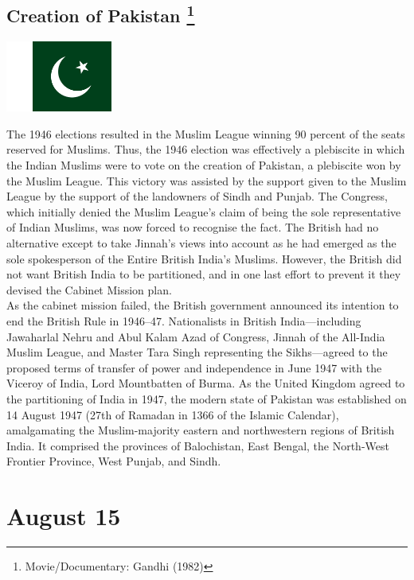 \documentclass[11pt]{report}
\begin{document}
\subsection{Creation of Pakistan \protect\footnote{Movie/Documentary: Gandhi (1982)}}
\vspace{2mm}\begin{center}\includegraphics[width=3.5cm]{./img/pakistanFlag.jpg}\end{center}
The 1946 elections resulted in the Muslim League winning 90 percent of the seats reserved for Muslims. Thus, the 1946 election was effectively a plebiscite in which the Indian Muslims were to vote on the creation of Pakistan, a plebiscite won by the Muslim League. This victory was assisted by the support given to the Muslim League by the support of the landowners of Sindh and Punjab. The Congress, which initially denied the Muslim League's claim of being the sole representative of Indian Muslims, was now forced to recognise the fact. The British had no alternative except to take Jinnah's views into account as he had emerged as the sole spokesperson of the Entire British India's Muslims. However, the British did not want British India to be partitioned, and in one last effort to prevent it they devised the Cabinet Mission plan.\\
\indent As the cabinet mission failed, the British government announced its intention to end the British Rule in 1946–47. Nationalists in British India—including Jawaharlal Nehru and Abul Kalam Azad of Congress, Jinnah of the All-India Muslim League, and Master Tara Singh representing the Sikhs—agreed to the proposed terms of transfer of power and independence in June 1947 with the Viceroy of India, Lord Mountbatten of Burma. As the United Kingdom agreed to the partitioning of India in 1947, the modern state of Pakistan was established on 14 August 1947 (27th of Ramadan in 1366 of the Islamic Calendar), amalgamating the Muslim-majority eastern and northwestern regions of British India. It comprised the provinces of Balochistan, East Bengal, the North-West Frontier Province, West Punjab, and Sindh.
\section{August 15}
\end{document}

